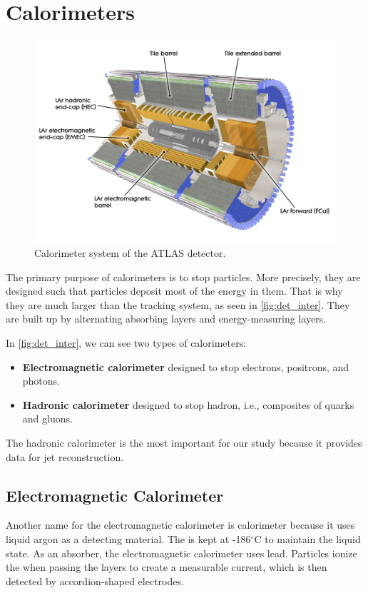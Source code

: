 \section{Calorimeters}
\label{sec:calorimeters}
\begin{figure}[htb]
    \centering
    \includegraphics[width=1\linewidth]{src/img/calo.jpg}
    \caption{Calorimeter system of the ATLAS detector.}
    \label{fig:calorimeter}
\end{figure}

The primary purpose of calorimeters is to stop particles. 
More precisely, they are designed such that particles deposit most of the energy in them.
That is why they are much larger than the tracking system, as seen in \cref{fig:det_inter}. 
They are built up by alternating absorbing layers and energy-measuring layers. 

In \cref{fig:det_inter}, we can see two types of calorimeters:
\begin{itemize}
    \item \textbf{Electromagnetic calorimeter} designed to stop electrons, positrons, and photons.
    \item \textbf{Hadronic calorimeter} designed to stop hadron, i.e., composites of quarks and gluons.
\end{itemize}

The hadronic calorimeter is the most important for our study because it provides data for jet reconstruction.


\subsection{Electromagnetic Calorimeter}
Another name for the electromagnetic calorimeter is \LAr calorimeter because it uses liquid argon as a detecting material.
The \LAr is kept at -186$^\circ$C to maintain the liquid state.
As an absorber, the electromagnetic calorimeter uses lead.
Particles ionize the \LAr when passing the layers to create a measurable current, which is then detected by accordion-shaped electrodes.

